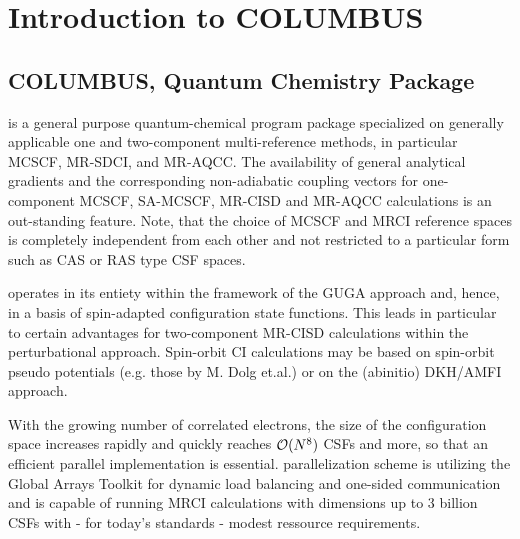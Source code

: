 \chapter{Introduction to COLUMBUS}
\section{COLUMBUS, Quantum Chemistry Package}
 is a general purpose quantum-chemical program package 
specialized on generally applicable one and two-component multi-reference methods, 
in particular MCSCF, MR-SDCI, and MR-AQCC. The availability of general analytical 
gradients and the corresponding non-adiabatic coupling vectors for
one-component MCSCF, SA-MCSCF, MR-CISD and MR-AQCC calculations is 
an out-standing feature. Note, that the choice of MCSCF and MRCI reference
spaces is completely independent from each other and not restricted to a
particular form such as CAS or RAS type CSF spaces. 

 operates in its entiety within the framework of the GUGA
approach and, hence, in a basis of spin-adapted configuration state functions. 
This leads in particular to certain advantages for two-component MR-CISD 
calculations within the perturbational approach. Spin-orbit CI calculations
may be based on spin-orbit pseudo potentials (e.g. those by M. Dolg et.al.)
or on the (abinitio) DKH/AMFI approach.

With the growing number of correlated electrons, the size of the configuration
space increases rapidly and quickly reaches ${\cal O}(N^8)$ CSFs and more,
so that an efficient parallel implementation is essential. 
parallelization scheme is utilizing the Global Arrays Toolkit for dynamic
load balancing and one-sided communication and is capable of running MRCI
calculations with dimensions up to 3 billion CSFs with  - for today's standards
- modest ressource requirements. 


